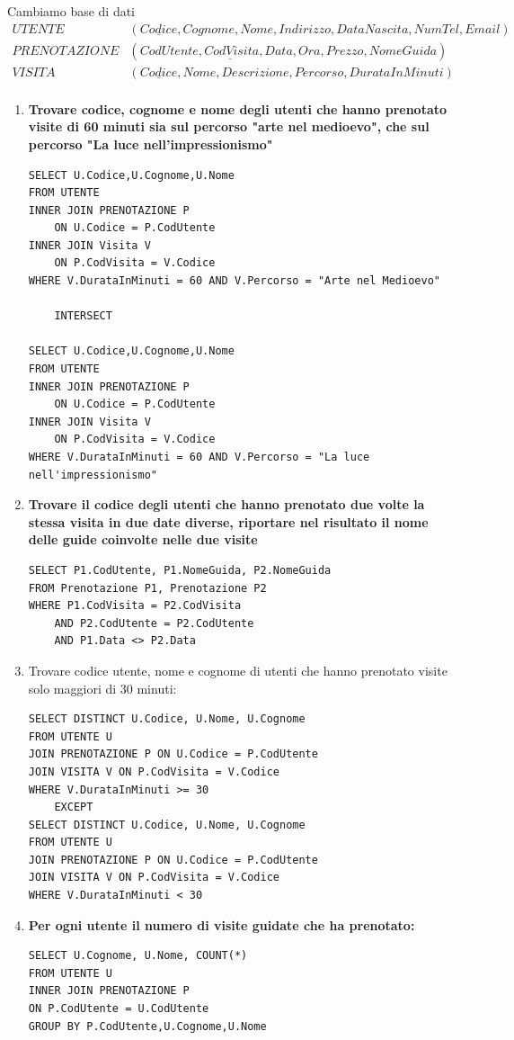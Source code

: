 \documentclass{article}
\begin{document}
Cambiamo base di dati
\begin{align*}
	UTENTE&(\underline{Codice}, Cognome, Nome, Indirizzo, DataNascita,NumTel,Email) \\
	PRENOTAZIONE&(\underline{CodUtente, CodVisita, Data, Ora}, Prezzo, NomeGuida)\\
	VISITA&(\underline{Codice}, Nome, Descrizione, Percorso, DurataInMinuti)\\
\end{align*}

\begin{enumerate}
	\item \textbf{Trovare codice, cognome e nome degli utenti che hanno prenotato visite di 60 minuti sia sul percorso "arte nel medioevo", che sul percorso "La luce nell'impressionismo"}
	
\begin{lstlisting}[style=sqlstyle]
SELECT U.Codice,U.Cognome,U.Nome
FROM UTENTE
INNER JOIN PRENOTAZIONE P
	ON U.Codice = P.CodUtente
INNER JOIN Visita V
	ON P.CodVisita = V.Codice
WHERE V.DurataInMinuti = 60 AND V.Percorso = "Arte nel Medioevo"

	INTERSECT
	
SELECT U.Codice,U.Cognome,U.Nome
FROM UTENTE
INNER JOIN PRENOTAZIONE P
	ON U.Codice = P.CodUtente
INNER JOIN Visita V
	ON P.CodVisita = V.Codice
WHERE V.DurataInMinuti = 60 AND V.Percorso = "La luce nell'impressionismo"
\end{lstlisting}
\item \textbf{Trovare il codice degli utenti che hanno prenotato due volte la stessa visita in due date diverse, riportare nel risultato il nome delle guide coinvolte nelle due visite}

\begin{lstlisting}[style=sqlstyle]
SELECT P1.CodUtente, P1.NomeGuida, P2.NomeGuida
FROM Prenotazione P1, Prenotazione P2
WHERE P1.CodVisita = P2.CodVisita
	AND P2.CodUtente = P2.CodUtente
	AND P1.Data <> P2.Data
\end{lstlisting}
\item Trovare codice utente, nome e cognome di utenti che hanno prenotato visite solo maggiori di 30 minuti:

\begin{lstlisting}[style=sqlstyle]
SELECT DISTINCT U.Codice, U.Nome, U.Cognome
FROM UTENTE U
JOIN PRENOTAZIONE P ON U.Codice = P.CodUtente
JOIN VISITA V ON P.CodVisita = V.Codice
WHERE V.DurataInMinuti >= 30
	EXCEPT
SELECT DISTINCT U.Codice, U.Nome, U.Cognome
FROM UTENTE U
JOIN PRENOTAZIONE P ON U.Codice = P.CodUtente
JOIN VISITA V ON P.CodVisita = V.Codice
WHERE V.DurataInMinuti < 30
\end{lstlisting}


\item \textbf{Per ogni utente il numero di visite guidate che ha prenotato:}

\begin{lstlisting}[style=sqlstyle]
SELECT U.Cognome, U.Nome, COUNT(*)
FROM UTENTE U
INNER JOIN PRENOTAZIONE P
ON P.CodUtente = U.CodUtente
GROUP BY P.CodUtente,U.Cognome,U.Nome
\end{lstlisting}

\end{enumerate}
\end{document}
